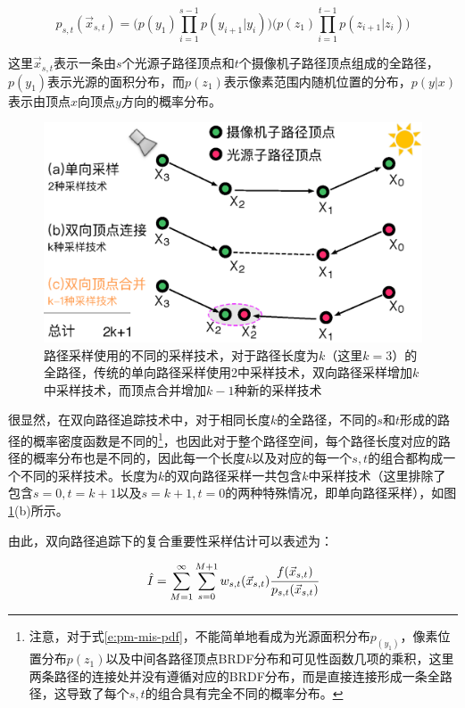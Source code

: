 \begin{equation}\label{e:pm-mis-pdf}
	p_{s,t}(\vec{x}_{s,t})=\Biggl(p(y_1)\prod^{s-1}_{i=1}p(y_{i+1}|y_i)\Biggl)\Biggl(p(z_1)\prod^{t-1}_{i=1}p(z_{i+1}|z_i)\Biggl)
\end{equation}

\noindent 这里$\vec{x}_{s,t}$表示一条由$s$个光源子路径顶点和$t$个摄像机子路径顶点组成的全路径，$p(y_1)$表示光源的面积分布，而$p(z_1)$表示像素范围内随机位置的分布，$p(y|x)$表示由顶点$x$向顶点$y$方向的概率分布。

\begin{figure}
	\sidecaption
	\includegraphics[width=.65\textwidth]{figures/pm/sampling-techniques}
	\caption{路径采样使用的不同的采样技术，对于路径长度为$k$（这里$k=3$）的全路径，传统的单向路径采样使用2中采样技术，双向路径采样增加$k$中采样技术，而顶点合并增加$k-1$种新的采样技术}
	\label{f:pm-sampling-techniques}
\end{figure}

很显然，在双向路径追踪技术中，对于相同长度$k$的全路径，不同的$s$和$t$形成的路径的概率密度函数是不同的\footnote{注意，对于式\ref{e:pm-mis-pdf}，不能简单地看成为光源面积分布$p_(y_1)$，像素位置分布$p(z_1)$以及中间各路径顶点BRDF分布和可见性函数几项的乘积，这里两条路径的连接处并没有遵循对应的BRDF分布，而是直接连接形成一条全路径，这导致了每个$s,t$的组合具有完全不同的概率分布。}，也因此对于整个路径空间，每个路径长度对应的路径的概率分布也是不同的，因此每一个长度$k$以及对应的每一个$s,t$的组合都构成一个不同的采样技术。长度为$k$的双向路径采样一共包含$k$中采样技术（这里排除了包含$s=0,t=k+1$以及$s=k+1,t=0$的两种特殊情况，即单向路径采样），如图\ref{f:pm-sampling-techniques}(b)所示。

由此，双向路径追踪下的复合重要性采样估计可以表述为：

\begin{equation}\label{e:pm-bpt-mis}
	\hat{I}=\sum^{\infty}_{M=1}\sum^{M+1}_{s=0}w_{s,t}(\vec{x}_{s,t}) \cfrac{f(\vec{x}_{s,t})}{p_{s,t}(\vec{x}_{s,t})}
\end{equation}

